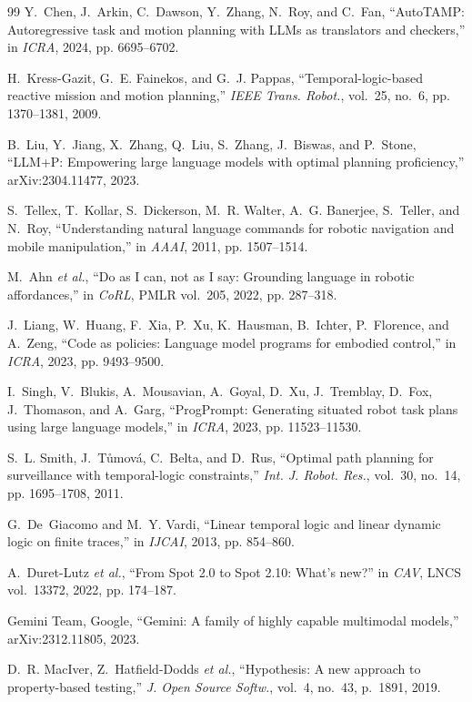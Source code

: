 \documentclass[letterpaper, 10 pt, conference]{ieeeconf}
\begin{document}
\begin{thebibliography}{99}
Y.~Chen, J.~Arkin, C.~Dawson, Y.~Zhang, N.~Roy, and C.~Fan, ``AutoTAMP: Autoregressive
task and motion planning with LLMs as translators and checkers,'' in \emph{ICRA},
2024, pp. 6695--6702.

H.~Kress-Gazit, G.~E. Fainekos, and G.~J. Pappas, ``Temporal-logic-based reactive
mission and motion planning,'' \emph{IEEE Trans. Robot.}, vol.~25, no.~6,
pp. 1370--1381, 2009.

B.~Liu, Y.~Jiang, X.~Zhang, Q.~Liu, S.~Zhang, J.~Biswas, and P.~Stone, ``LLM+P:
Empowering large language models with optimal planning proficiency,''
arXiv:2304.11477, 2023.

S.~Tellex, T.~Kollar, S.~Dickerson, M.~R. Walter, A.~G. Banerjee, S.~Teller, and
N.~Roy, ``Understanding natural language commands for robotic navigation and mobile
manipulation,'' in \emph{AAAI}, 2011, pp. 1507--1514.

M.~Ahn \emph{et al.}, ``Do as I can, not as I say: Grounding language in robotic
affordances,'' in \emph{CoRL}, PMLR vol.~205, 2022, pp. 287--318.

J.~Liang, W.~Huang, F.~Xia, P.~Xu, K.~Hausman, B.~Ichter, P.~Florence, and A.~Zeng,
``Code as policies: Language model programs for embodied control,'' in \emph{ICRA},
2023, pp. 9493--9500.

I.~Singh, V.~Blukis, A.~Mousavian, A.~Goyal, D.~Xu, J.~Tremblay, D.~Fox, J.~Thomason,
and A.~Garg, ``ProgPrompt: Generating situated robot task plans using large language
models,'' in \emph{ICRA}, 2023, pp. 11523--11530.

S.~L. Smith, J.~T{\r u}mov{\'a}, C.~Belta, and D.~Rus, ``Optimal path planning for
surveillance with temporal-logic constraints,'' \emph{Int. J. Robot. Res.}, vol.~30,
no.~14, pp. 1695--1708, 2011.

G.~De~Giacomo and M.~Y. Vardi, ``Linear temporal logic and linear dynamic logic on
finite traces,'' in \emph{IJCAI}, 2013, pp. 854--860.

A.~Duret-Lutz \emph{et al.}, ``From Spot 2.0 to Spot 2.10: What's new?'' in
\emph{CAV}, LNCS vol.~13372, 2022, pp. 174--187.

Gemini Team, Google, ``Gemini: A family of highly capable multimodal models,''
arXiv:2312.11805, 2023.

D.~R. MacIver, Z.~Hatfield-Dodds \emph{et al.}, ``Hypothesis: A new approach to
property-based testing,'' \emph{J. Open Source Softw.}, vol.~4, no.~43, p.~1891, 2019.


\end{thebibliography}
\end{document}
